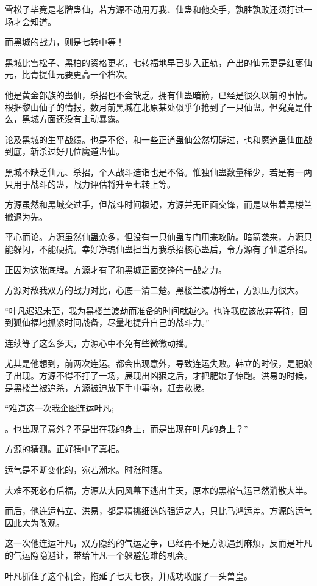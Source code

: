 \begin{this_body}
雪松子毕竟是老牌蛊仙，若方源不动用万我、仙蛊和他交手，孰胜孰败还须打过一场才会知道。

而黑城的战力，则是七转中等！

黑城比雪松子、黑柏的资格更老，七转福地早已步入正轨，产出的仙元更是红枣仙元，比青提仙元要更高一个档次。

他是黄金部族的蛊仙，杀招也不会缺乏。拥有仙蛊暗箭，已经是很久以前的事情。根据黎山仙子的情报，数月前黑城在北原某处似乎争抢到了一只仙蛊。但究竟是什么，黑城方面还没有主动暴露。

论及黑城的生平战绩。也是不俗，和一些正道蛊仙公然切磋过，也和魔道蛊仙血战到底，斩杀过好几位魔道蛊仙。

黑城不缺乏仙元、杀招，个人战斗造诣也是不俗。惟独仙蛊数量稀少，若是有一两只用于战斗的蛊，战力评估将升至七转上等。

方源虽然和黑城交过手，但战斗时间极短，方源并无正面交锋，而是以带着黑楼兰撤退为先。

平心而论。方源虽然仙蛊众多，但没有一只仙蛊专门用来攻防。暗箭袭来，方源只能躲闪，不能硬抗。幸好净魂仙蛊担当万我杀招核心蛊后，令方源有了仙道杀招。

正因为这张底牌。方源才有了和黑城正面交锋的一战之力。

方源对敌我双方的战力对比，心底一清二楚。黑楼兰渡劫将至，方源压力很大。

“叶凡迟迟未至，我为黑楼兰渡劫而准备的时间就越少。也许我应该放弃等待，回到狐仙福地抓紧时间战备，尽量地提升自己的战斗力。”

连续等了这么多天，方源心中不免有些微微动摇。

尤其是他想到，前两次连运。都会出现意外，导致连运失败。韩立的时候，是肥娘子出现。方源不得不打了一场，展现出凶狠之后，才把肥娘子惊跑。洪易的时候，是黑楼兰被追杀，方源被迫放下手中事物，赶去救援。

“难道这一次我企图连运叶凡;

。也出现了意外？不是出在我的身上，而是出现在叶凡的身上？”

方源的猜测。正好猜中了真相。

运气是不断变化的，宛若潮水。时涨时落。

大难不死必有后福，方源从大同风幕下逃出生天，原本的黑棺气运已然消散大半。

而后，他连运韩立、洪易，都是精挑细选的强运之人，只比马鸿运差。方源的运气因此大为改观。

这一次他连运叶凡，双方隐约的气运之争，已经再不是方源遇到麻烦，反而是叶凡的气运隐隐避让，带给叶凡一个躲避危难的机会。

叶凡抓住了这个机会，拖延了七天七夜，并成功收服了一头兽皇。


\end{this_body}
